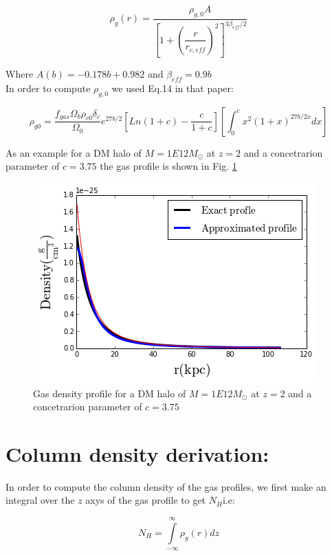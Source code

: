 \documentclass[12pt]{article}
\begin{document}
\begin{equation}\label{eq:rhogr}
\rho_g(r) =  \dfrac{\rho_{g,0}A}{\left[ 1 + \left(\dfrac{r}{r_{c,eff}}\right)^2 \right]^{3\beta_{eff}/2}}
\end{equation}

Where $A(b) = -0.178b + 0.982$ and $\beta_{eff} = 0.9 b$\\

In order to compute $\rho_{g,0}$ we used Eq.14 in that paper:

\begin{equation}\label{eq:rhog0}
\rho_{g0} = \dfrac{f_{gas}\Omega_{b}\rho_{c0}\delta_{c}}{\Omega_0}e^{27b/2} \left [ Ln(1+c) - \dfrac{c}{1+c}  \right ] \left [ \int_0^c x^2(1+x)^{27b/2x} dx \right ]
\end{equation}

As an example for a DM  halo of $M = 1E12 M_{\odot}$ at $z=2$ and a concetrarion parameter of $c=3.75$
the gas profile is shown in Fig. \ref{fig:gp}

\begin{figure}\label{fig:gp}
\centering
\includegraphics[scale=0.7]{../figures/gasprofile.png}
\caption{Gas density profile for a DM  halo of $M = 1E12 M_{\odot}$ at $z=2$ and a concetrarion parameter of $c=3.75$}
\end{figure} 


\section{Column density derivation:}\label{sec:NH}

In order to compute the column density of the gas profiles, we first
make an integral over the $z$ axys of the gas profile to get $N_{H}$i.e:

\begin{equation}
N_{H} = \int \limits_{-\infty}^{\infty}\rho_g(r)dz
\end{equation}
\end{document}
